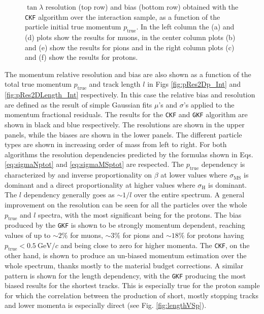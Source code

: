 \begin{figure}[t]
\begin{subfigure}{0.32\textwidth}
         \caption{}
         \label{fig:tanlambdaBiasVSp2212_Int}
     \end{subfigure}
        \caption[$\tan\lambda$ resolution (top row) and bias (bottom row) obtained with the \texttt{CKF}  algorithm over the interaction sample, as a function of the particle initial true momentum.]{$\tan\lambda$ resolution (top row) and bias (bottom row) obtained with the \texttt{CKF}  algorithm over the interaction sample, as a function of the particle initial true momentum $p_\text{true}$. In the left column the (a) and (d) plots show the results for muons, in the center column plots (b) and (e) show the results for pions and in the right column plots (c) and (f) show the results for protons.}
        \label{fig:tanlambdaRes2Dp_Int}
\end{figure}


The momentum relative resolution and bias are also shown as a function of the total true momentum $p_\textrm{true}$ and track length $l$ in Figs \ref{fig:pRes2Dp_Int} and \ref{fig:pRes2DLength_Int} respectively. In this case the relative bias and resolution are defined as the result of simple Gaussian fits $\mu$'s and $\sigma$'s applied to the momentum fractional residuals. The results for the \texttt{CKF} and \texttt{GKF} algorithm are shown in black and blue respectively. The resolutions are shown in the upper panels, while the biases are shown in the lower panels. The different particle types are shown in increasing order of mass from left to right. For both algorithms the resolution dependencies predicted by the formulas shown in Eqs. \ref{eq:sigmaNptot} and \ref{eq:sigmaMSptot} are respected. The $p_\textrm{true}$ dependency is characterized by and inverse proportionality on $\beta$ at lower values where $\sigma_\textrm{MS}$ is dominant and a direct proportionality at higher values where $\sigma_\textrm{H}$ is dominant. The $l$ dependency generally goes as $\sim 1/l$ over the entire spectrum. A general improvement on the resolution can be seen for all the particles over the whole $p_\textrm{true}$ and $l$ spectra, with the most significant being for the protons. The bias produced by the \texttt{GKF} is shown to be strongly momentum dependent, reaching values of up to $\sim 2\%$ for muons, $\sim 3\%$ for pions and $\sim 18\%$ for protons having $p_\textrm{true}<0.5 \ \textrm{GeV}/c$ and being close to zero for higher momenta. The \texttt{CKF}, on the other hand, is shown to produce an un-biased momentum estimation over the whole spectrum, thanks mostly to the material budget corrections. A similar pattern is shown for the length dependency, with the \texttt{GKF} producing the most biased results for the shortest tracks. This is especially true for the proton sample for which the correlation between the production of short, mostly stopping tracks and lower momenta is especially direct (see Fig. \ref{fig:lengthVSp}).


